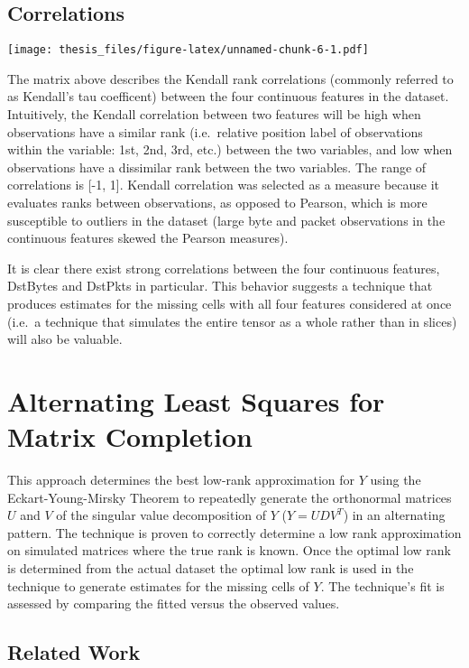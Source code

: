 \documentclass[12pt,twoside]{dukestatscithesis}
\theoremstyle{definition}
\theoremstyle{definition}
\theoremstyle{definition}
\theoremstyle{remark}
\begin{document}
\section{Correlations}\label{correlations}

\texttt{[image: thesis\_files/figure-latex/unnamed-chunk-6-1.pdf]}

The matrix above describes the Kendall rank correlations (commonly
referred to as Kendall's tau coefficent) between the four continuous
features in the dataset. Intuitively, the Kendall correlation between
two features will be high when observations have a similar rank
(i.e.~relative position label of observations within the variable: 1st,
2nd, 3rd, etc.) between the two variables, and low when observations
have a dissimilar rank between the two variables. The range of
correlations is {[}-1, 1{]}. Kendall correlation was selected as a
measure because it evaluates ranks between observations, as opposed to
Pearson, which is more susceptible to outliers in the dataset (large
byte and packet observations in the continuous features skewed the
Pearson measures).

It is clear there exist strong correlations between the four continuous
features, DstBytes and DstPkts in particular. This behavior suggests a
technique that produces estimates for the missing cells with all four
features considered at once (i.e.~a technique that simulates the entire
tensor as a whole rather than in slices) will also be valuable.

\chapter{Alternating Least Squares for Matrix
Completion}\label{alternating-least-squares-for-matrix-completion}

This approach determines the best low-rank approximation for \(Y\) using
the Eckart-Young-Mirsky Theorem to repeatedly generate the orthonormal
matrices \(U\) and \(V\) of the singular value decomposition of \(Y\)
(\(Y = UDV^T\)) in an alternating pattern. The technique is proven to
correctly determine a low rank approximation on simulated matrices where
the true rank is known. Once the optimal low rank is determined from the
actual dataset the optimal low rank is used in the technique to generate
estimates for the missing cells of \(Y\). The technique's fit is
assessed by comparing the fitted versus the observed values.

\section{Related Work}\label{related-work}
\end{document}

